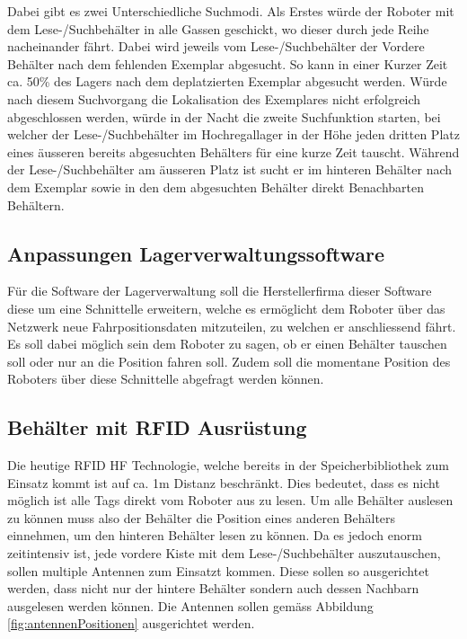 Dabei gibt es zwei Unterschiedliche Suchmodi. Als Erstes würde der Roboter mit dem Lese-/Suchbehälter in alle Gassen geschickt, wo dieser durch jede Reihe nacheinander fährt. Dabei wird jeweils vom Lese-/Suchbehälter der Vordere Behälter nach dem fehlenden Exemplar abgesucht. So kann in einer Kurzer Zeit ca. 50\% des Lagers nach dem deplatzierten Exemplar abgesucht werden. Würde nach diesem Suchvorgang die Lokalisation des Exemplares nicht erfolgreich abgeschlossen werden, würde in der Nacht die zweite Suchfunktion starten, bei welcher der Lese-/Suchbehälter im Hochregallager in der Höhe jeden dritten Platz eines äusseren bereits abgesuchten Behälters für eine kurze Zeit tauscht. Während der Lese-/Suchbehälter am äusseren Platz ist sucht er im hinteren Behälter nach dem Exemplar sowie in den dem abgesuchten Behälter direkt Benachbarten Behältern.

\subsection{Anpassungen Lagerverwaltungssoftware}
\label{sec:roboterSWAnpassung}
Für die Software der Lagerverwaltung soll die Herstellerfirma dieser Software diese um eine Schnittelle erweitern, welche es ermöglicht dem Roboter über das Netzwerk neue Fahrpositionsdaten mitzuteilen, zu welchen er anschliessend fährt. Es soll dabei möglich sein dem Roboter zu sagen, ob er einen Behälter tauschen soll oder nur an die Position fahren soll. Zudem soll die momentane Position des Roboters über diese Schnittelle abgefragt werden können. 

\subsection{Behälter mit RFID Ausrüstung}
\label{sec:behaelterMitRFID}
Die heutige RFID HF Technologie, welche bereits in der Speicherbibliothek zum Einsatz kommt ist auf ca. 1m Distanz beschränkt. Dies bedeutet, dass es nicht möglich ist alle Tags direkt vom Roboter aus zu lesen. Um alle Behälter auslesen zu können muss also der Behälter die Position eines anderen Behälters einnehmen, um den hinteren Behälter lesen zu können. Da es jedoch enorm zeitintensiv ist, jede vordere Kiste mit dem Lese-/Suchbehälter auszutauschen, sollen multiple Antennen zum Einsatzt kommen. Diese sollen so ausgerichtet werden, dass nicht nur der hintere Behälter sondern auch dessen Nachbarn ausgelesen werden können.
Die Antennen sollen gemäss Abbildung \ref{fig:antennenPositionen} ausgerichtet werden.

